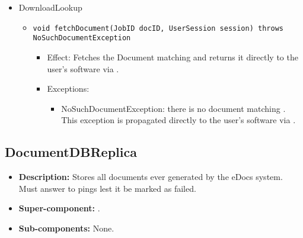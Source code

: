 \begin{itemize}
    \item DownloadLookup
	\begin{itemize}
		\item \texttt{void fetchDocument(JobID docID, UserSession session) throws NoSuchDocumentException}
		\begin{itemize}
			\item Effect: Fetches the Document matching  and returns it directly to the user's software via .
			\item Exceptions:
			\begin{itemize}
				\item NoSuchDocumentException: there is no document matching . This exception is propagated directly to the user's software via .
			\end{itemize}
		\end{itemize}
	\end{itemize}
\end{itemize}

\subsection{DocumentDBReplica}
\begin{itemize}
    \item \textbf{Description:} Stores all documents ever generated by the eDocs system. Must answer to pings lest it be marked as failed.
    \item \textbf{Super-component:} .
    \item \textbf{Sub-components:} None.
\end{itemize}

